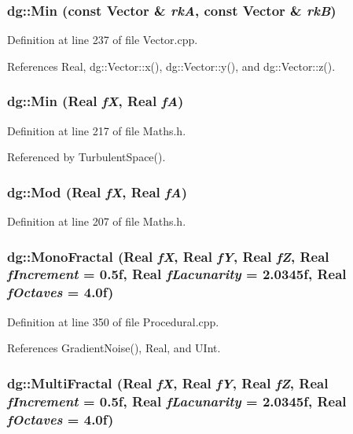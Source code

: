 \subsubsection{ dg::Min (const {\bf Vector} \& {\em rk\-A}, const {\bf Vector} \& {\em rk\-B})}\label{namespacedg_a184}




Definition at line 237 of file Vector.cpp.

References Real, dg::Vector::x(), dg::Vector::y(), and dg::Vector::z().
\subsubsection{ dg::Min ({\bf Real} {\em f\-X}, {\bf Real} {\em f\-A})\hspace{0.3cm}{\tt  [inline]}}\label{namespacedg_a105}




Definition at line 217 of file Maths.h.

Referenced by Turbulent\-Space().
\subsubsection{ dg::Mod ({\bf Real} {\em f\-X}, {\bf Real} {\em f\-A})\hspace{0.3cm}{\tt  [inline]}}\label{namespacedg_a107}




Definition at line 207 of file Maths.h.
\subsubsection{ dg::Mono\-Fractal ({\bf Real} {\em f\-X}, {\bf Real} {\em f\-Y}, {\bf Real} {\em f\-Z}, {\bf Real} {\em f\-Increment} = 0.5f, {\bf Real} {\em f\-Lacunarity} = 2.0345f, {\bf Real} {\em f\-Octaves} = 4.0f)}\label{namespacedg_a132}




Definition at line 350 of file Procedural.cpp.

References Gradient\-Noise(), Real, and UInt.
\subsubsection{ dg::Multi\-Fractal ({\bf Real} {\em f\-X}, {\bf Real} {\em f\-Y}, {\bf Real} {\em f\-Z}, {\bf Real} {\em f\-Increment} = 0.5f, {\bf Real} {\em f\-Lacunarity} = 2.0345f, {\bf Real} {\em f\-Octaves} = 4.0f)}\label{namespacedg_a133}




